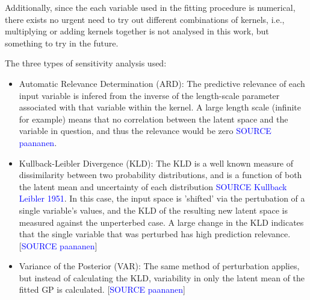 \documentclass[a4paper, twoside, final, 12pt]{article}
\begin{document}
Additionally, since the each variable used in the fitting procedure is numerical, there exists no urgent need to try out different combinations of kernels, i.e., multiplying or adding kernels together is not analysed in this work, but something to try in the future. 

The three types of sensitivity analysis used:
\begin{itemize}
	\item Automatic Relevance Determination (ARD): The predictive relevance of each input variable is infered from the inverse of the length-scale parameter associated with that variable within the kernel. A large length scale (infinite for example) means that no correlation between the latent space and the variable in question, and thus the relevance would be zero \textcolor{blue}{SOURCE paananen}. 
	\item Kullback-Leibler Divergence (KLD): The KLD is a well known measure of dissimilarity between two probability distributions, and is a function of both the latent mean and uncertainty of each distribution \textcolor{blue}{SOURCE Kullback Leibler 1951}. In this case, the input space is 'shifted' via the pertubation of a single variable's values, and the KLD of the resulting new latent space is measured against the unperterbed case. A large change in the KLD indicates that the single variable that was perturbed has high prediction relevance.  [\textcolor{blue}{SOURCE paananen}]
	\item Variance of the Posterior (VAR): The same method of perturbation applies, but instead of calculating the KLD, variability in  only the latent mean of the fitted GP is calculated. [\textcolor{blue}{SOURCE paananen}]
\end{itemize}
\end{document}
